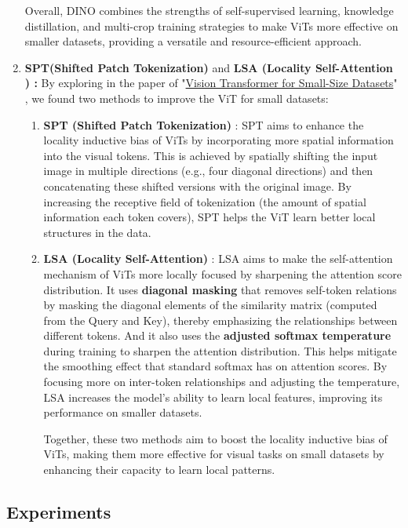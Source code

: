 \documentclass{article}
\begin{document}
\begin{enumerate}
\begin{enumerate}
\end{enumerate}
Overall, DINO combines the strengths of self-supervised learning, knowledge distillation, and multi-crop training strategies to make ViTs more effective on smaller datasets, providing a versatile and resource-efficient approach. 
    \item \textbf{SPT(Shifted Patch Tokenization)}  and \textbf{LSA (Locality Self-Attention )  :} By exploring in the paper of  "\href{https://arxiv.org/pdf/2112.13492}{Vision Transformer for Small-Size Datasets}" , we found two methods to improve the ViT for small datasets:
    \begin{enumerate}
        \item \textbf{SPT (Shifted Patch Tokenization)} : SPT aims to enhance the locality inductive bias of ViTs by incorporating more spatial information into the visual tokens. This is achieved by spatially shifting the input image in multiple directions (e.g., four diagonal directions) and then concatenating these shifted versions with the original image. By increasing the receptive field of tokenization (the amount of spatial information each token covers), SPT helps the ViT learn better local structures in the data. 
        \item \textbf{LSA (Locality Self-Attention) }: LSA aims to make the self-attention mechanism of ViTs more locally focused by sharpening the attention score distribution. It uses \textbf{diagonal masking} that removes self-token relations by masking the diagonal elements of the similarity matrix (computed from the Query and Key), thereby emphasizing the relationships between different tokens. And it also uses the \textbf{adjusted softmax temperature} during training to sharpen the attention distribution. This helps mitigate the smoothing effect that standard softmax has on attention scores. By focusing more on inter-token relationships and adjusting the temperature, LSA increases the model's ability to learn local features, improving its performance on smaller datasets. 

Together, these two methods aim to boost the locality inductive bias of ViTs, making them more effective for visual tasks on small datasets by enhancing their capacity to learn local patterns. 

    \end{enumerate}

\end{enumerate}

\subsection{Experiments}
\end{document}
